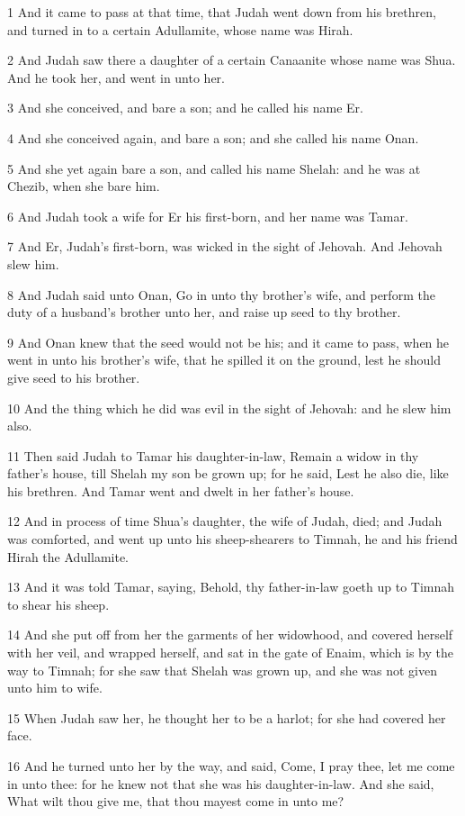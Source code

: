 \par 1 And it came to pass at that time, that Judah went down from his brethren, and turned in to a certain Adullamite, whose name was Hirah.
\par 2 And Judah saw there a daughter of a certain Canaanite whose name was Shua. And he took her, and went in unto her.
\par 3 And she conceived, and bare a son; and he called his name Er.
\par 4 And she conceived again, and bare a son; and she called his name Onan.
\par 5 And she yet again bare a son, and called his name Shelah: and he was at Chezib, when she bare him.
\par 6 And Judah took a wife for Er his first-born, and her name was Tamar.
\par 7 And Er, Judah's first-born, was wicked in the sight of Jehovah. And Jehovah slew him.
\par 8 And Judah said unto Onan, Go in unto thy brother's wife, and perform the duty of a husband's brother unto her, and raise up seed to thy brother.
\par 9 And Onan knew that the seed would not be his; and it came to pass, when he went in unto his brother's wife, that he spilled it on the ground, lest he should give seed to his brother.
\par 10 And the thing which he did was evil in the sight of Jehovah: and he slew him also.
\par 11 Then said Judah to Tamar his daughter-in-law, Remain a widow in thy father's house, till Shelah my son be grown up; for he said, Lest he also die, like his brethren. And Tamar went and dwelt in her father's house.
\par 12 And in process of time Shua's daughter, the wife of Judah, died; and Judah was comforted, and went up unto his sheep-shearers to Timnah, he and his friend Hirah the Adullamite.
\par 13 And it was told Tamar, saying, Behold, thy father-in-law goeth up to Timnah to shear his sheep.
\par 14 And she put off from her the garments of her widowhood, and covered herself with her veil, and wrapped herself, and sat in the gate of Enaim, which is by the way to Timnah; for she saw that Shelah was grown up, and she was not given unto him to wife.
\par 15 When Judah saw her, he thought her to be a harlot; for she had covered her face.
\par 16 And he turned unto her by the way, and said, Come, I pray thee, let me come in unto thee: for he knew not that she was his daughter-in-law. And she said, What wilt thou give me, that thou mayest come in unto me?
